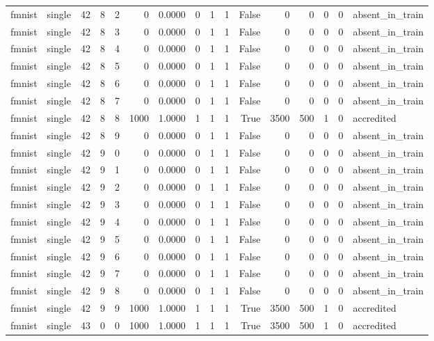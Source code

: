 \begin{tabular}{llrrrrrrrrrrrrrl}
fmnist & single & 42 & 8 & 2 & 0 & 0.0000 & 0 & 1 & 1 & False & 0 & 0 & 0 & 0 & absent\_in\_train \\
fmnist & single & 42 & 8 & 3 & 0 & 0.0000 & 0 & 1 & 1 & False & 0 & 0 & 0 & 0 & absent\_in\_train \\
fmnist & single & 42 & 8 & 4 & 0 & 0.0000 & 0 & 1 & 1 & False & 0 & 0 & 0 & 0 & absent\_in\_train \\
fmnist & single & 42 & 8 & 5 & 0 & 0.0000 & 0 & 1 & 1 & False & 0 & 0 & 0 & 0 & absent\_in\_train \\
fmnist & single & 42 & 8 & 6 & 0 & 0.0000 & 0 & 1 & 1 & False & 0 & 0 & 0 & 0 & absent\_in\_train \\
fmnist & single & 42 & 8 & 7 & 0 & 0.0000 & 0 & 1 & 1 & False & 0 & 0 & 0 & 0 & absent\_in\_train \\
fmnist & single & 42 & 8 & 8 & 1000 & 1.0000 & 1 & 1 & 1 & True & 3500 & 500 & 1 & 0 & accredited \\
fmnist & single & 42 & 8 & 9 & 0 & 0.0000 & 0 & 1 & 1 & False & 0 & 0 & 0 & 0 & absent\_in\_train \\
fmnist & single & 42 & 9 & 0 & 0 & 0.0000 & 0 & 1 & 1 & False & 0 & 0 & 0 & 0 & absent\_in\_train \\
fmnist & single & 42 & 9 & 1 & 0 & 0.0000 & 0 & 1 & 1 & False & 0 & 0 & 0 & 0 & absent\_in\_train \\
fmnist & single & 42 & 9 & 2 & 0 & 0.0000 & 0 & 1 & 1 & False & 0 & 0 & 0 & 0 & absent\_in\_train \\
fmnist & single & 42 & 9 & 3 & 0 & 0.0000 & 0 & 1 & 1 & False & 0 & 0 & 0 & 0 & absent\_in\_train \\
fmnist & single & 42 & 9 & 4 & 0 & 0.0000 & 0 & 1 & 1 & False & 0 & 0 & 0 & 0 & absent\_in\_train \\
fmnist & single & 42 & 9 & 5 & 0 & 0.0000 & 0 & 1 & 1 & False & 0 & 0 & 0 & 0 & absent\_in\_train \\
fmnist & single & 42 & 9 & 6 & 0 & 0.0000 & 0 & 1 & 1 & False & 0 & 0 & 0 & 0 & absent\_in\_train \\
fmnist & single & 42 & 9 & 7 & 0 & 0.0000 & 0 & 1 & 1 & False & 0 & 0 & 0 & 0 & absent\_in\_train \\
fmnist & single & 42 & 9 & 8 & 0 & 0.0000 & 0 & 1 & 1 & False & 0 & 0 & 0 & 0 & absent\_in\_train \\
fmnist & single & 42 & 9 & 9 & 1000 & 1.0000 & 1 & 1 & 1 & True & 3500 & 500 & 1 & 0 & accredited \\
fmnist & single & 43 & 0 & 0 & 1000 & 1.0000 & 1 & 1 & 1 & True & 3500 & 500 & 1 & 0 & accredited \\

\end{tabular}

